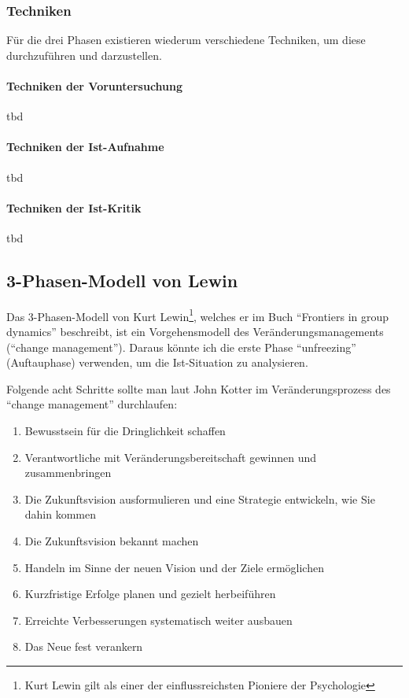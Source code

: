 \subsubsection{Techniken}
Für die drei Phasen existieren wiederum verschiedene Techniken,
um diese durchzuführen und darzustellen.

\paragraph{Techniken der Voruntersuchung}
tbd

\paragraph{Techniken der Ist-Aufnahme}
tbd

\paragraph{Techniken der Ist-Kritik}
tbd

\subsection{3-Phasen-Modell von Lewin}
Das 3-Phasen-Modell von Kurt Lewin\footnote{Kurt Lewin gilt als einer der einflussreichsten Pioniere der Psychologie}, 
welches er im Buch ``Frontiers in group dynamics''\cite[S. 5-41]{lewinfrontiers} 
beschreibt, ist ein Vorgehensmodell des Veränderungsmanagements (``change management'').
Daraus könnte ich die erste Phase ``unfreezing'' (Auftauphase) verwenden, um die Ist-Situation
zu analysieren.

Folgende acht Schritte sollte man laut John Kotter\cite{kotter2006pinguin} im Veränderungsprozess
des ``change management'' durchlaufen:

\begin{enumerate}
    \item Bewusstsein für die Dringlichkeit schaffen
    \item Verantwortliche mit Veränderungsbereitschaft gewinnen und zusammenbringen
    \item Die Zukunftsvision ausformulieren und eine Strategie entwickeln, wie Sie dahin kommen
    \item Die Zukunftsvision bekannt machen
    \item Handeln im Sinne der neuen Vision und der Ziele ermöglichen
    \item Kurzfristige Erfolge planen und gezielt herbeiführen
    \item Erreichte Verbesserungen systematisch weiter ausbauen
    \item Das Neue fest verankern
\end{enumerate}

